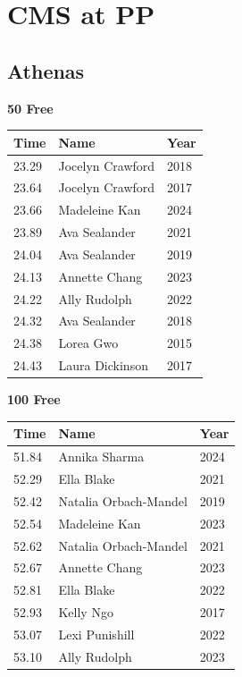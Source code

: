 \section{CMS at PP}
\clearpage
\subsection{Athenas}
\vspace{1.2em}
\noindent\begin{minipage}[t]{0.48\textwidth}
\centering
\textbf{\textcolor{teamprimary}{50 Free}}\par
\vspace{0.5em}
\centering
\small
\renewcommand{\arraystretch}{1.0}
\setlength{\tabcolsep}{4pt}
\begin{tabular}{@{}p{1.8cm}p{3.0cm}p{1.0cm}@{}}
\toprule
\textbf{Time} & \textbf{Name} & \textbf{Year} \\
\midrule
23.29 & Jocelyn Crawford & 2018 \\
23.64 & Jocelyn Crawford & 2017 \\
23.66 & Madeleine Kan & 2024 \\
23.89 & Ava Sealander & 2021 \\
24.04 & Ava Sealander & 2019 \\
24.13 & Annette Chang & 2023 \\
24.22 & Ally Rudolph & 2022 \\
24.32 & Ava Sealander & 2018 \\
24.38 & Lorea Gwo & 2015 \\
24.43 & Laura Dickinson & 2017 \\
\bottomrule
\end{tabular}
\end{minipage}
\hfill
\begin{minipage}[t]{0.48\textwidth}
\centering
\textbf{\textcolor{teamprimary}{100 Free}}\par
\vspace{0.5em}
\centering
\small
\renewcommand{\arraystretch}{1.0}
\setlength{\tabcolsep}{4pt}
\begin{tabular}{@{}p{1.8cm}p{3.0cm}p{1.0cm}@{}}
\toprule
\textbf{Time} & \textbf{Name} & \textbf{Year} \\
\midrule
51.84 & Annika Sharma & 2024 \\
52.29 & Ella Blake & 2021 \\
52.42 & Natalia Orbach-Mandel & 2019 \\
52.54 & Madeleine Kan & 2023 \\
52.62 & Natalia Orbach-Mandel & 2021 \\
52.67 & Annette Chang & 2023 \\
52.81 & Ella Blake & 2022 \\
52.93 & Kelly Ngo & 2017 \\
53.07 & Lexi Punishill & 2022 \\
53.10 & Ally Rudolph & 2023 \\
\bottomrule
\end{tabular}
\end{minipage}
